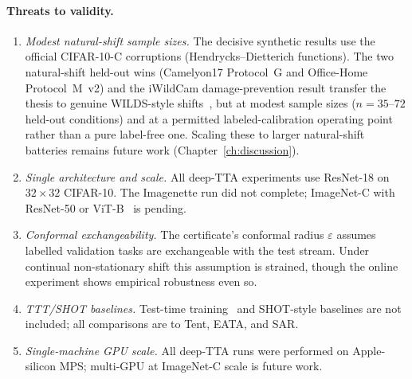 \paragraph{Threats to validity.}
\begin{enumerate}
\item \emph{Modest natural-shift sample sizes.}  The decisive synthetic results use
  the official CIFAR-10-C corruptions (Hendrycks--Dietterich functions).  The two
  natural-shift held-out wins (Camelyon17 Protocol~G and Office-Home Protocol~M~v2)
  and the iWildCam damage-prevention result transfer the thesis to genuine WILDS-style
  shifts~\cite{koh2021wilds,venkateswara2017officehome}, but at modest sample sizes
  ($n{=}35$--$72$ held-out conditions) and at a permitted labeled-calibration operating
  point rather than a pure label-free one.  Scaling these to larger natural-shift
  batteries remains future work (Chapter~\ref{ch:discussion}).
\item \emph{Single architecture and scale.}  All deep-TTA experiments use
  ResNet-18 on $32{\times}32$ CIFAR-10.  The Imagenette run did not complete;
  ImageNet-C with ResNet-50 or ViT-B~\cite{dosovitskiy2021vit,he2016resnet} is pending.
\item \emph{Conformal exchangeability.}  The certificate's conformal radius
  $\varepsilon$ assumes labelled validation tasks are exchangeable with the test
  stream.  Under continual non-stationary shift this assumption is strained,
  though the online experiment shows empirical robustness even so.
\item \emph{TTT/SHOT baselines.}  Test-time training~\cite{wang2021tent} and
  SHOT-style baselines are not included; all comparisons are to Tent, EATA, and SAR.
\item \emph{Single-machine GPU scale.}  All deep-TTA runs were performed on
  Apple-silicon MPS; multi-GPU at ImageNet-C scale is future work.
\end{enumerate}
